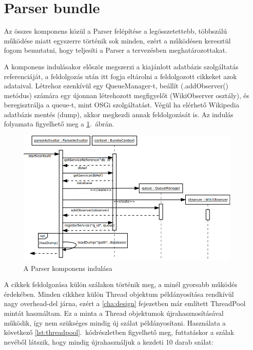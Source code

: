 
\section{Parser bundle}
\label{sec:parserbundle}

Az összes komponens közül a Parser felépítése a legösszetettebb, többszálú működése miatt egyszerre történik sok minden, ezért a működésen keresztül fogom bemutatni, hogy teljesíti a Parser a tervezésben meghatározottakat.

A komponens indulásakor először megszerzi a kiajánlott adatbázis szolgáltatás referenciáját, a feldolgozás után itt fogja eltárolni a feldolgozott cikkeket azok adataival. Létrehoz ezenkívül egy QueueManager-t, beállít (.addObserver() metódus) számára egy újonnan létrehozott megfigyelőt (WikiObserver osztály), és beregisztrálja a queue-t, mint OSGi szolgáltatást. Végül ha elérhető Wikipedia adatbázis mentés (dump), akkor megkezdi annak feldolgozását is. Az indulás folyamata figyelhető meg a \ref{fig:sequence_parser}.~ábrán.

\begin{figure}[htp]
\centering
\includegraphics[scale=0.5]{img/sequence_parser}
\caption{A Parser komponens indulása}
\label{fig:sequence_parser}
\end{figure}

A cikkek feldolgozása külön szálakon történik meg, a minél gyorsabb működés érdekében. Minden cikkhez külön Thread objektum példányosítása rendkívül nagy overhead-del járna, ezért a \ref{cha:design} fejezetben már említett ThreadPool mintát használtam. Ez a minta a Thread objektumok újrahasznosításával működik, így nem szükséges mindig új szálat példányosítani. Használata a következő \ref{lst:threadpool}.~kódrészletben figyelhető meg, futtatáskor a szálak nevéből látszik, hogy mindig újrahasználjuk a kezdeti 10 darab szálat:

